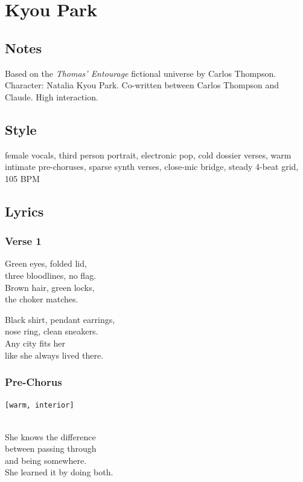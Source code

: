 \section{Kyou Park}\label{kyou-park}

\subsection{Notes}\label{notes-22}

Based on the \emph{Thomas' Entourage} fictional universe by Carlos
Thompson. Character: Natalia Kyou Park. Co-written between Carlos
Thompson and Claude. High interaction.

\subsection{Style}\label{style-21}

female vocals, third person portrait, electronic pop, cold dossier
verses, warm intimate pre-choruses, sparse synth verses, close-mic
bridge, steady 4-beat grid, 105 BPM

\subsection{Lyrics}\label{lyrics-21}

\subsubsection{Verse 1}\label{verse-1-17}

Green eyes, folded lid,\\
three bloodlines, no flag.\\
Brown hair, green locks,\\
the choker matches.

Black shirt, pendant earrings,\\
nose ring, clean sneakers.\\
Any city fits her\\
like she always lived there.

\subsubsection{Pre-Chorus}\label{pre-chorus-41}

\texttt{{[}warm,\ interior{]}}\strut \\
She knows the difference\\
between passing through\\
and being somewhere.\\
She learned it by doing both.

